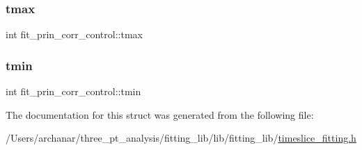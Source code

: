 \subsubsection{\texorpdfstring{tmax}{tmax}}
{\footnotesize\ttfamily int fit\+\_\+prin\+\_\+corr\+\_\+control\+::tmax}

\mbox{\label{structfit__prin__corr__control_a52c3c241301827f01f7c96f31b55e389}} 
\subsubsection{\texorpdfstring{tmin}{tmin}}
{\footnotesize\ttfamily int fit\+\_\+prin\+\_\+corr\+\_\+control\+::tmin}



The documentation for this struct was generated from the following file\+:\begin{DoxyCompactItemize}
\item 
/\+Users/archanar/three\+\_\+pt\+\_\+analysis/fitting\+\_\+lib/lib/fitting\+\_\+lib/\mbox{\hyperlink{lib_2fitting__lib_2timeslice__fitting_8h}{timeslice\+\_\+fitting.\+h}}\end{DoxyCompactItemize}
